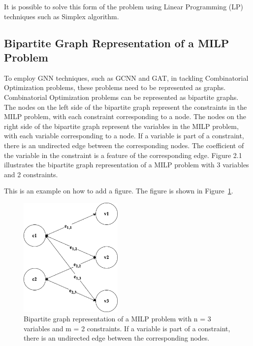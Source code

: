 It is possible to solve this form of the problem using Linear Programming (LP) techniques such as Simplex algorithm.


\subsection{Bipartite Graph Representation of a MILP Problem}
\label{sec:bipartite_graph_representation}


To employ GNN techniques, such as GCNN and GAT, in tackling Combinatorial Optimization problems, these problems need to be represented as graphs.
Combinatorial Optimization problems can be represented as bipartite graphs.
The nodes on the left side of the bipartite graph represent the constraints in the MILP problem, with each constraint corresponding to a node.
The nodes on the right side of the bipartite graph represent the variables in the MILP problem, with each variable corresponding to a node.
If a variable is part of a constraint, there is an undirected edge between the corresponding nodes.
The coefficient of the variable in the constraint is a feature of the corresponding edge.
Figure 2.1 illustrates the bipartite graph representation of a MILP problem with 3 variables and 2 constraints.

This is an example on how to add a figure.
The figure is shown in Figure~\ref{fig:biparite-graph}.

\begin{figure}[htb!]
    \centering
    \includegraphics[width=0.45\textwidth]{figures/Bipartite Graph.drawio}
    \caption{Bipartite graph representation of a MILP problem with n = 3 variables and m = 2 constraints. If a variable is part of a constraint, there is an undirected edge between the corresponding nodes.}
    \label{fig:biparite-graph}
\end{figure}